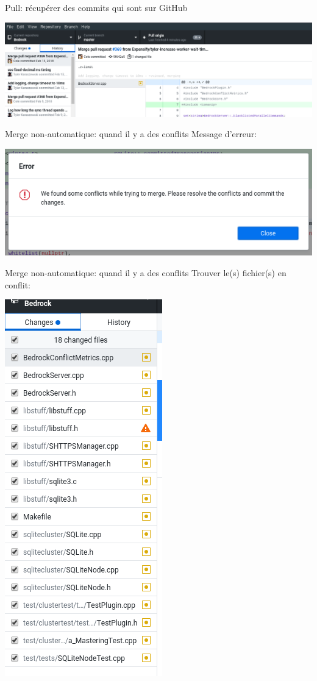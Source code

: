 \documentclass{beamer}
\begin{document}
\begin{frame}{Pull: récupérer des commits qui sont sur GitHub}
    \begin{center}
        \includegraphics[width=\textwidth]{img/github_desktop/pull_2.png}
    \end{center}
\end{frame}

\begin{frame}{Merge non-automatique: quand il y a des conflits}
    Message d'erreur:
    \begin{center}
        \includegraphics[width=.9\textwidth]{img/github_desktop/conflit_1.png}
    \end{center}
\end{frame}

\begin{frame}{Merge non-automatique: quand il y a des conflits}
    Trouver le(s) fichier(s) en conflit:
    \begin{center}
        \includegraphics[width=.27\textwidth]{img/github_desktop/conflit_2.png}
    \end{center}
\end{frame}
\end{document}
